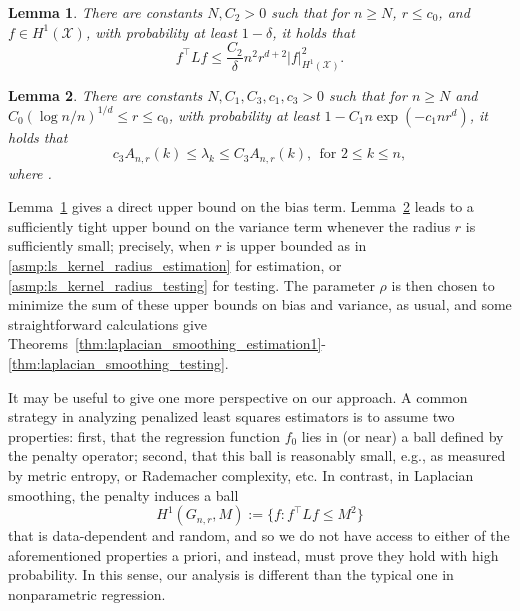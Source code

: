 \documentclass[twoside]{article}
\newcommand{\1}{\mathbf{1}}
\newcommand{\Xset}{\mathcal{X}}
\newtheorem{lemma}{Lemma}
\theoremstyle{definition}
\theoremstyle{remark}
\begin{document}
\begin{lemma}
	\label{lem:graph_sobolev_seminorm}
	There are constants $N,C_2 > 0$ such that for $n \geq N$, $r \leq c_0$, and $f \in H^1(\Xset)$, with probability at least $1 - \delta$, it holds that
	\begin{equation}
	\label{eqn:graph_sobolev_seminorm}
	f^\top L f \leq \frac{C_2}{\delta} n^2 r^{d + 2} |f|_{H^1(\Xset)}^2.
	\end{equation}
\end{lemma}

\begin{lemma}
	\label{lem:neighborhood_eigenvalue} 
	There are constants $N,C_1,C_3,c_1,c_3 > 0$ such that for $n \geq N$ and $C_0(\log n/n)^{1/d} \leq r \leq c_0$, with probability at least $1 - C_1n\exp(-c_1nr^d)$, it holds that
	\begin{equation}
	\label{eqn:neighborhood_eigenvalue}
	c_3A_{n,r}(k) \leq \lambda_k \leq C_3A_{n,r}(k), ~~\textrm{for $2 \leq k \leq n$},
	\end{equation}
	where .
\end{lemma}

Lemma~\ref{lem:graph_sobolev_seminorm} gives a direct upper bound on the bias term. Lemma~\ref{lem:neighborhood_eigenvalue} leads to a sufficiently tight upper bound on the variance term whenever the radius $r$ is sufficiently small; precisely, when $r$ is upper bounded as in \ref{asmp:ls_kernel_radius_estimation} for estimation, or \ref{asmp:ls_kernel_radius_testing} for testing. The parameter $\rho$ is then chosen to minimize the sum of these upper bounds on bias and variance, as usual, and some straightforward calculations give Theorems~\ref{thm:laplacian_smoothing_estimation1}-\ref{thm:laplacian_smoothing_testing}.

It may be useful to give one more perspective on our approach. A common strategy in analyzing penalized least squares estimators is to assume two properties: first, that the regression function $f_0$ lies in (or near) a ball defined by the penalty operator; second, that this ball is reasonably small, e.g., as measured by metric entropy, or Rademacher complexity, etc. In contrast, in Laplacian smoothing, the penalty induces a ball
\begin{equation*}
H^1(G_{n,r},M) := \{f: f^\top L f \leq M^2\}
\end{equation*}
that is data-dependent and random, and so we do not have access to either of the aforementioned properties a priori, and instead, must prove they hold with high probability. In this sense, our analysis is different than the typical one in nonparametric regression.
\end{document}
